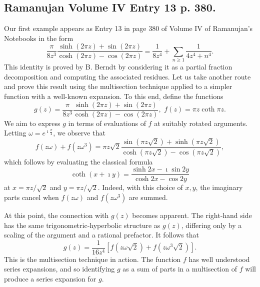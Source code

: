 \documentclass[11pt,oneside,reqno]{article}
\theoremstyle{definition}
\begin{document}
\subsection{Ramanujan Volume IV Entry 13 p. 380.}
Our first example appears as Entry 13 in page 380 of Volume IV of Ramanujan's Notebooks \cite{R4} in the form
\begin{equation}
\label{Entry13}
\frac{\pi}{8z^{3}}\frac{\sinh\left(2\pi z\right)+\sin\left(2\pi z\right)}{\cosh\left(2\pi z\right)-\cos\left(2\pi z\right)}=\frac{1}{8z^{4}}+\sum_{n\ge1}\frac{1}{4z^{4}+n^{4}}.
\end{equation}
This identity is proved by B. Berndt by considering it as a partial fraction decomposition and computing the associated residues. Let us take another route and prove this result using the multisection technique applied to a simpler function with a well-known expansion. To this end, define the functions
\begin{equation}
g\left(z\right)=\frac{\pi}{8z^{3}}\frac{\sinh\left(2\pi z\right)+\sin\left(2\pi z\right)}{\cosh\left(2\pi z\right)-\cos\left(2\pi z\right)},\,\,f\left(z\right)=\pi z\coth \pi z.
\end{equation}
We aim to express $g$ in terms of evaluations of $f$ at suitably rotated arguments. Letting $\omega=e^{\imath\frac{\pi}{4}}$, we observe that
\begin{equation}
f\left(z\omega\right)+f\left(z\omega^{3}\right)=\pi z\sqrt{2}\frac{\sin\left(\pi z\sqrt{2}\right)+\sinh\left(\pi z\sqrt{2}\right)}{\cosh\left(\pi z\sqrt{2}\right)-\cos\left(\pi z\sqrt{2}\right)},
\end{equation}
which follows by evaluating the classical formula \cite[4.35.37]{NIST}
\begin{equation}
\coth\left(x+\imath y\right)=\frac{\sinh2x-\imath\sin2y}{\cosh2x-\cos2y}
\end{equation}
at $x=\pi z/\sqrt{2}$ and $y=\pi z/\sqrt{2}$. Indeed, with this choice of $x,y$, the imaginary parts cancel when $f(z\omega)$ and $f(z\omega^3)$ are summed.

At this point, the connection with $g(z)$ becomes apparent. The right-hand side has the same trigonometric-hyperbolic structure as $g(z)$, differing only by a scaling of the argument and a rational prefactor. It follows that
\begin{equation}
\label{g}
g\left(z\right)=\frac{1}{16z^{4}}\left[f\left( z\omega\sqrt{2}\right)+f\left( z\omega^{3}\sqrt{2}\right)\right].
\end{equation}
This is the multisection technique in action. The function $f$ has well understood series expansions, and so identifying $g$ as a sum of parts in a multisection  of $f$ will produce a series expansion for $g$. 
\end{document}
